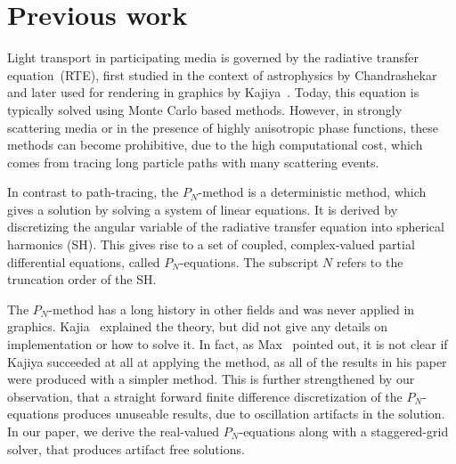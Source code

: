 \section{Previous work}

Light transport in participating media is governed by the radiative transfer equation~(RTE), first studied in the context of astrophysics by Chandrashekar~\cite{Chandrasekhar60} and later used for rendering in graphics by Kajiya~\cite{Kajiya86}. Today, this equation is typically solved using Monte Carlo based methods. However, in strongly scattering media or in the presence of highly anisotropic phase functions, these methods can become prohibitive, due to the high computational cost, which comes from tracing long particle paths with many scattering events.

In contrast to path-tracing, the $P_N$-method is a deterministic method, which gives a solution by solving a system of linear equations. It is derived by discretizing the angular variable of the radiative transfer equation into spherical harmonics (SH). This gives rise to a set of coupled, complex-valued partial differential equations, called $P_N$-equations. The subscript $N$ refers to the truncation order of the SH. 

The $P_N$-method has a long history in other fields and was never applied in graphics. Kajia~\cite{Kajiya84} explained the theory, but did not give any details on implementation or how to solve it. In fact, as Max~\cite{Max95} pointed out, it is not clear if Kajiya succeeded at all at applying the method, as all of the results in his paper were produced with a simpler method. This is further strengthened by our observation, that a straight forward finite difference discretization of the $P_N$-equations produces unuseable results, due to oscillation artifacts in the solution. In our paper, we derive the real-valued $P_N$-equations along with a staggered-grid solver, that produces artifact free solutions.

